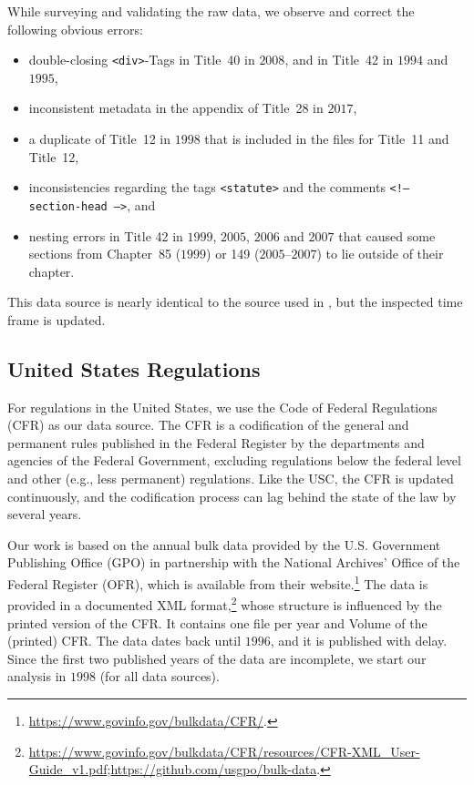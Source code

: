 \documentclass[utf8,sort&compress,numbers,square,table,hidelinks]{frontiers_suppmat} %
\begin{document}
While surveying and validating the raw data, we observe and correct the following obvious errors:
\begin{itemize}
	\item double-closing \texttt{<div>}-Tags in Title~40 in $2008$, and in Title~42 in $1994$ and $1995$,
	\item inconsistent metadata in the appendix of Title~28 in $2017$,
	\item a duplicate of Title~12 in $1998$ that is included in the files for Title~11 and Title~12, 
	\item inconsistencies regarding the tags \texttt{<statute>} and the comments \texttt{<!-- \/section-head -->}, and
	\item nesting errors in Title 42 in $1999$, $2005$, $2006$ and $2007$ that caused some sections from Chapter~85 ($1999$) or 149 ($2005$--$2007$) to lie outside of their chapter.
\end{itemize}	
	
This data source is nearly identical to the source used in \cite{katz2020}, 
but the inspected time frame is updated.

\vspace*{6pt}
\subsection{United States Regulations}
\label{subsec:uscfr}

For regulations in the United States,
we use the Code of Federal Regulations (CFR) as our data source. 
The CFR is a codification of the general and permanent rules published in the Federal Register by the departments and agencies of the Federal Government, excluding regulations below the federal level and other (e.g., less permanent) regulations.
Like the USC, the CFR is updated continuously, and the codification process can lag behind the state of the law by several years.

Our work is based on the annual bulk data provided by the U.S. Government Publishing Office (GPO) in partnership with the National Archives’ Office of the Federal Register (OFR), which is available from their website.\footnote{\url{https://www.govinfo.gov/bulkdata/CFR/}.}
The data is provided in a documented XML format,\footnote{\url{https://www.govinfo.gov/bulkdata/CFR/resources/CFR-XML_User-Guide_v1.pdf};\newline \url{https://github.com/usgpo/bulk-data}.} 
whose structure is influenced by the printed version of the CFR. 
It contains one file per year and Volume of the (printed) CFR.
The data dates back until $1996$, and it is published with delay. 
Since the first two published years of the data are incomplete, we start our analysis in $1998$ (for all data sources).
\end{document}
